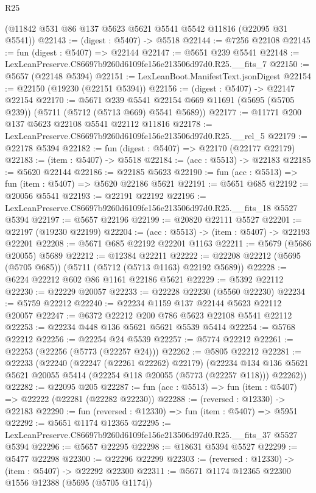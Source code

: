 \begin{lexlean}{R25}
\begin{coremodule}
    (@11842 @531 @86 @137 @5623 @5621 @5541 @5542 @11816 (@22095 @31 @5541))
@22143 := (digest : @5407) -> @5518
@22144 := @7256 @22108
@22145 := fun (digest : @5407) => @22144
@22147 := @5651 @239 @5541
@22148 := LexLeanPreserve.C86697b9260d6109fe156e213506d97d0.R25.__fits_7
@22150 := @5657 (@22148 @5394)
@22151 := LexLeanBoot.ManifestText.jsonDigest
@22154 := @22150 (@19230 (@22151 @5394))
@22156 := (digest : @5407) -> @22147 @22154
@22170 := @5671
    @239
    @5541
    @22154
    @669
    @11691
    (@5695 (@5705 @239))
    (@5711 (@5712 (@5713 @669) @5541 @5689))
@22177 := @11771 @200 @137 @5623 @22108 @5541 @22112 @11816
@22178 := LexLeanPreserve.C86697b9260d6109fe156e213506d97d0.R25.__rel_5
@22179 := @22178 @5394
@22182 := fun (digest : @5407) => @22170 (@22177 @22179)
@22183 := (item : @5407) -> @5518
@22184 := (acc : @5513) -> @22183
@22185 := @5620 @22144
@22186 := @22185 @5623
@22190 := fun (acc : @5513) => fun (item : @5407) => @5620 @22186 @5621
@22191 := @5651 @685
@22192 := @20056 @5541
@22193 := @22191 @22192
@22196 := LexLeanPreserve.C86697b9260d6109fe156e213506d97d0.R25.__fits_18 @5527 @5394
@22197 := @5657 @22196
@22199 := @20820 @22111 @5527
@22201 := @22197 (@19230 @22199)
@22204 := (acc : @5513) -> (item : @5407) -> @22193 @22201
@22208 := @5671 @685 @22192 @22201 @1163
@22211 := @5679 (@5686 @20055) @5689
@22212 := @12384 @22211
@22222 := @22208 @22212 (@5695 (@5705 @685)) (@5711 (@5712 (@5713 @1163) @22192 @5689))
@22228 := @6224 @22212 @602 @86 @1161 @22186 @5621
@22229 := @5392 @22112
@22230 := @22229 @20057
@22233 := @22228 @22230 (@5560 @22230)
@22234 := @5759 @22212
@22240 := @22234 @1159 @137 @22144 @5623 @22112 @20057
@22247 := @6372 @22212 @200 @786 @5623 @22108 @5541 @22112
@22253 := @22234 @448 @136 @5621 @5621 @5539 @5414
@22254 := @5768 @22212
@22256 := @22254 @24 @5539
@22257 := @5774 @22212
@22261 := @22253 (@22256 (@5773 (@22257 @24)))
@22262 := @5805 @22212
@22281 := @22233
    (@22240
      (@22247 (@22261 @22262) @22179)
      (@22234 @134 @136 @5621 @5621 @20055 @5414 (@22254 @118 @20055 (@5773 (@22257 @118))) @22262))
@22282 := @22095 @205
@22287 := fun (acc : @5513) => fun (item : @5407) => @22222 (@22281 (@22282 @22230))
@22288 := (reversed : @12330) -> @22183
@22290 := fun (reversed : @12330) => fun (item : @5407) => @5951
@22292 := @5651 @1174 @12365
@22295 := LexLeanPreserve.C86697b9260d6109fe156e213506d97d0.R25.__fits_37 @5527 @5394
@22296 := @5657 @22295
@22298 := @18631 @5394 @5527
@22299 := @5477 @22298
@22300 := @22296 @22299
@22303 := (reversed : @12330) -> (item : @5407) -> @22292 @22300
@22311 := @5671 @1174 @12365 @22300 @1556 @12388 (@5695 (@5705 @1174))

\end{coremodule}
\end{lexlean}
